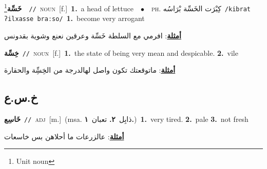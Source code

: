 \documentclass[10pt,a4paper,twoside]{article} %
\begin{document}
\begin{multicols}{2}
{\setlength\topsep{0pt}\textbf{\foreignlanguage{arabic}{خَسِّة}}\footnote{Unit noun}\ \ {\color{gray}\texttt{//}\color{black}}\ \textsc{noun}\ [f.]\ \textbf{1.}~a head of lettuce\ \ $\bullet$\ \ \textsc{ph.} \color{gray} \foreignlanguage{arabic}{كِبْرَت الخَسِّة بْرَاسُه}\color{black}\ {\color{gray}\texttt{/{\sffamily kibrat ʔilxasse braːso}/}\color{black}}\ \textbf{1.}~become very arrogant\  \begin{flushright}\color{gray}\foreignlanguage{arabic}{\textbf{\underline{\foreignlanguage{arabic}{أمثلة}}}: افرمي مع السلطة خَسِّة وعرقين نعنع وشوية بقدونس}\end{flushright}\color{black}} \vspace{2mm}

{\setlength\topsep{0pt}\textbf{\foreignlanguage{arabic}{خِسِّة}}\ {\color{gray}\texttt{//}\color{black}}\ \textsc{noun}\ [f.]\ \textbf{1.}~the state of being very mean and despicable.  \textbf{2.}~vile\  \begin{flushright}\color{gray}\foreignlanguage{arabic}{\textbf{\underline{\foreignlanguage{arabic}{أمثلة}}}: ماتوقعتك تكون واصل لهالدرجة من الخِسِِّة والحقارة}\end{flushright}\color{black}} \vspace{2mm}

\vspace{-3mm}
\subsection*{\color{blue}\foreignlanguage{arabic}{خ.س.ع}\color{blue}{}} 

{\setlength\topsep{0pt}\textbf{\foreignlanguage{arabic}{خَاسِع}}\ {\color{gray}\texttt{//}\color{black}}\ \textsc{adj}\ [m.]\ \color{gray}(msa. \foreignlanguage{arabic}{ذابِل}~\foreignlanguage{arabic}{\textbf{٢.}}  \foreignlanguage{arabic}{تعبان}~\foreignlanguage{arabic}{\textbf{١.}})\color{black}\ \textbf{1.}~very tired.  \textbf{2.}~pale  \textbf{3.}~not fresh\  \begin{flushright}\color{gray}\foreignlanguage{arabic}{\textbf{\underline{\foreignlanguage{arabic}{أمثلة}}}: عالزرعات ما أحلاهن بس خاسعات}\end{flushright}\color{black}} \vspace{2mm}


\end{multicols}
\end{document}
